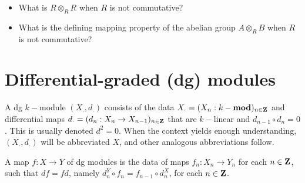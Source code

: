 \documentclass{amsart}
\begin{document}
\begin{itemize}
	\item What is $R \otimes_R R$ when $R$ is not commutative?
	\item What is the defining mapping property of the abelian group $A \otimes_R B$ when $R$
		is not commutative?
\end{itemize}

\section{Differential-graded (dg) modules}

A dg $k-$module $(X_\cdot, d_\cdot)$ consists of the data $X_\cdot = (X_n : k-\mathbf{mod})_{n \in \mathbf{Z}}$ and 
differential maps $d_\cdot = (d_n : X_n \to X_{n-1})_{n \in \mathbf{Z}}$ that are $k-$linear and $d_{n-1} \circ d_n = 0$.
This is usually denoted $d^2 = 0$. When the context yields enough understanding, $(X_\cdot, d_\cdot)$ will be
abbreviated $X$, and other analogous abbreviations follow.

\begin{defn}
	A map $f : X \to Y$ of dg modules is the data of maps $f_n : X_n \to Y_n$ for each $n \in \mathbf{Z}$, such
	that $df = fd$, namely $d_n^Y \circ f_n = f_{n-1} \circ d_n^X$, for each $n \in \mathbf{Z}$.
\end{defn}
\end{document}
